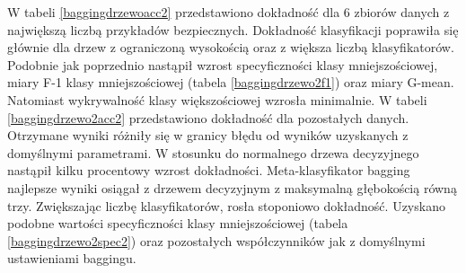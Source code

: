W tabeli \ref{baggingdrzewoacc2} przedstawiono dokładność dla 6 zbiorów danych z największą liczbą przykładów bezpiecznych. Dokładność klasyfikacji poprawiła się głównie dla drzew z ograniczoną wysokością oraz z większa liczbą klasyfikatorów. 
Podobnie jak poprzednio nastąpił wzrost specyficzności klasy mniejszościowej, miary F-1 klasy mniejszościowej (tabela \ref{baggingdrzewo2f1}) oraz miary G-mean. Natomiast wykrywalność klasy większościowej wzrosła minimalnie. W tabeli \ref{baggingdrzewo2acc2} przedstawiono dokładność dla pozostałych danych. Otrzymane wyniki różniły się w granicy błędu od wyników uzyskanych z domyślnymi parametrami. W stosunku do normalnego drzewa decyzyjnego nastąpił kilku procentowy wzrost dokładności. Meta-klasyfikator bagging najlepsze wyniki osiągał z drzewem decyzyjnym z maksymalną głębokością równą trzy. Zwiększając liczbę klasyfikatorów, rosła stoponiowo dokładność. Uzyskano podobne wartości specyficzności klasy mniejszościowej (tabela \ref{baggingdrzewo2spec2}) oraz pozostałych współczynników jak z domyślnymi ustawieniami baggingu.

